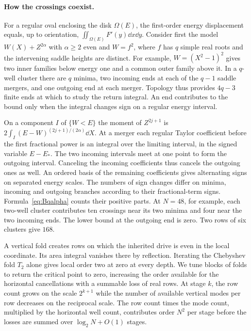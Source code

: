 \paragraph{How the crossings coexist.}
For a regular oval enclosing the disk \(\Omega(E)\), the first-order energy displacement equals, up to orientation, \(\iint_{\Omega(E)} F'(y)\dd x\dd y\). Consider first the model \(W(X)+Z^{2\alpha}\) with \(\alpha\ge2\) even and \(W=f^2\), where \(f\) has \(q\) simple real roots and the intervening saddle heights are distinct. For example, \(W=(X^2-1)^2\) gives two inner families below energy one and a common outer family above it. In a \(q\)-well cluster there are \(q\) minima, two incoming ends at each of the \(q-1\) saddle mergers, and one outgoing end at each merger. Topology thus provides \(4q-3\) finite ends at which to study the return integral. An end contributes to the bound only when the integral changes sign on a regular energy interval.

On a component \(I\) of \(\{W<E\}\) the moment of \(Z^{2j+1}\) is \(2\int_I(E-W)^{(2j+1)/(2\alpha)}\dd X\). At a merger each regular Taylor coefficient before the first fractional power is an integral over the limiting interval, in the signed variable \(E-E_*\). The two incoming intervals meet at one point to form the outgoing interval. Canceling the incoming coefficients thus cancels the outgoing ones as well. An ordered basis of the remaining coefficients gives alternating signs on separated energy scales. The numbers of sign changes differ on minima, incoming and outgoing branches according to their fractional-term signs. Formula~\eqref{eq:Bqalpha} counts their positive parts. At \(N=48\), for example, each two-well cluster contributes ten crossings near its two minima and four near the two incoming ends. The lower bound at the outgoing end is zero. Two rows of six clusters give \(168\).

A vertical fold creates rows on which the inherited drive is even in the local coordinate. Its area integral vanishes there by reflection. Iterating the Chebyshev fold \(T_2\) alone gives local order two at zero at every depth. We tune blocks of folds to return the critical point to zero, increasing the order available for the horizontal cancellations with a summable loss of real rows. At stage \(k\), the row count grows on the scale \(2^{k+1}\) while the number of available vertical modes per row decreases on the reciprocal scale. The row count times the mode count, multiplied by the horizontal well count, contributes order \(N^2\) per stage before the losses are summed over \(\log_2 N+O(1)\) stages.

